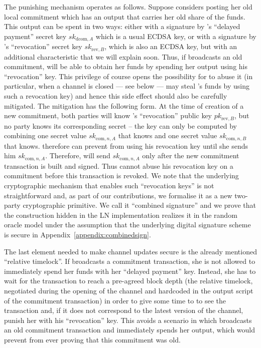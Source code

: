     The punishing mechanism operates as follows. Suppose \alice{} considers
    posting her old local commitment which has an output that carries her old
    share of the funds. This output can be spent in two ways: either with a
    signature by \alice's ``delayed payment'' secret key $sk_{\mathrm{dcom}, A}$
    which is a usual ECDSA key, or with a signature by \bob's ``revocation''
    secret key $sk_{\mathrm{rev}, B}$, which is also an ECDSA key, but with an
    additional characteristic that we will explain soon. Thus, if \alice{}
    broadcasts an old commitment, \bob{} will be able to obtain her funds by
    spending her output using his ``revocation'' key. This privilege of course
    opens the possibility for \bob{} to abuse it (in particular, when a channel
    is closed --- see below --- \bob{} may steal \alice's funds by using such a
    revocation key) and hence this side effect should also be carefully
    mitigated. The mitigation has the following form. At the time of creation of
    a new commitment, both parties will know \bob's ``revocation'' public key
    $pk_{\mathrm{rev}, B}$, but no party knows its corresponding secret -- the
    key can only be computed by combining one secret value $sk_{\mathrm{com}, n,
    A}$ that \alice{} knows and one secret value $sk_{\mathrm{com}, n, B}$ that
    \bob{} knows. \alice{} therefore can prevent \bob{} from using his
    revocation key until she sends him $sk_{\mathrm{com}, n, A}$. Therefore,
    \alice{} will send \bob{} $sk_{\mathrm{com}, n, A}$ only after the new
    commitment transaction is built and signed. Thus \bob{} cannot abuse his
    revocation key on a commitment before this transaction is revoked. We note
    that the underlying cryptographic mechanism  that enables such ``revocation
    keys'' is not straightforward and, as part of our contributions, we
    formalise it as a new two-party cryptographic primitive. We call it
    ``combined signature'' and we prove that the construction hidden in the LN
    implementation realizes it in the random oracle model under the assumption
    that the underlying digital signature scheme is secure in
    Appendix~\ref{appendix:combinedsign}.

    The last element needed to make channel updates secure is the already
    mentioned ``relative timelock''. If \alice{} broadcasts a commitment
    transaction, she is not allowed to immediately spend her funds with her
    ``delayed payment'' key. Instead, she has to wait for the transaction to
    reach a pre-agreed block depth (the relative timelock, negotiated during
    the opening of the channel and hardcoded in the output script of the
    commitment transaction) in order to give some time to \bob{} to see the
    transaction and, if it does not correspond to the latest version of the
    channel, punish her with his ``revocation'' key. This avoids a scenario in
    which \alice{} broadcasts an old commitment transaction and immediately
    spends her output, which would prevent \bob{} from ever proving that this
    commitment was old.

